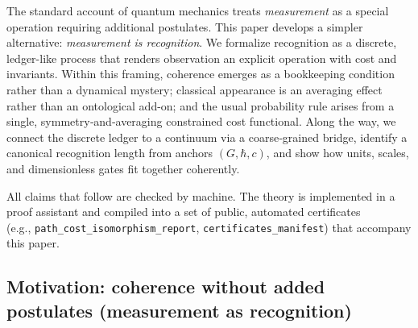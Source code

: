 \documentclass[12pt,a4paper]{article}
\theoremstyle{definition}
\theoremstyle{remark}
\begin{document}
The standard account of quantum mechanics treats \emph{measurement} as a special operation requiring additional postulates. This paper develops a simpler alternative: \emph{measurement is recognition}. We formalize recognition as a discrete, ledger-like process that renders observation an explicit operation with cost and invariants. Within this framing, coherence emerges as a bookkeeping condition rather than a dynamical mystery; classical appearance is an averaging effect rather than an ontological add-on; and the usual probability rule arises from a single, symmetry‑and‑averaging constrained cost functional. Along the way, we connect the discrete ledger to a continuum via a coarse‑grained bridge, identify a canonical recognition length from anchors $(G,\hbar,c)$, and show how units, scales, and dimensionless gates fit together coherently.

All claims that follow are checked by machine. The theory is implemented in a proof assistant and compiled into a set of public, automated certificates \\
(e.g., \texttt{path\_cost\_isomorphism\_report}, \texttt{certificates\_manifest}) that accompany this paper.

\subsection{Motivation: coherence without added postulates (measurement as recognition)}
\label{sec:motivation}
\end{document}
